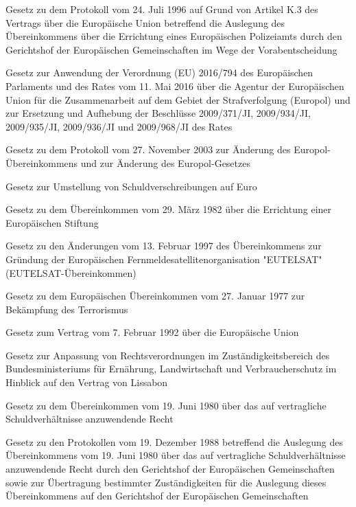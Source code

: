 \item[{EuropolAuslProtG}] Gesetz zu dem Protokoll vom 24. Juli 1996 auf Grund von Artikel K.3 des Vertrags über die Europäische Union betreffend die Auslegung des Übereinkommens über die Errichtung eines Europäischen Polizeiamts durch den Gerichtshof der Europäischen Gemeinschaften im Wege der Vorabentscheidung

\item[{EuropolG}] Gesetz zur Anwendung der Verordnung (EU) 2016/794 des Europäischen Parlaments und des Rates vom 11. Mai 2016 über die Agentur der Europäischen Union für die Zusammenarbeit auf dem Gebiet der Strafverfolgung (Europol) und zur Ersetzung und Aufhebung der Beschlüsse 2009/371/JI, 2009/934/JI, 2009/935/JI, 2009/936/JI und 2009/968/JI des Rates

\item[{EuropolÜbk-GÄndProtG}] Gesetz zu dem Protokoll vom 27. November 2003 zur Änderung des Europol-Übereinkommens und zur Änderung des Europol-Gesetzes

\item[{EuroUmstG}] Gesetz zur Umstellung von Schuldverschreibungen auf Euro

\item[{EuStiftÜbkG}] Gesetz zu dem Übereinkommen vom 29. März 1982 über die Errichtung einer Europäischen Stiftung

\item[{EUTELSATÜbkÄndG}] Gesetz zu den Änderungen vom 13. Februar 1997 des Übereinkommens zur Gründung der Europäischen Fernmeldesatellitenorganisation "EUTELSAT" (EUTELSAT-Übereinkommen)

\item[{EuTerrorÜbkG}] Gesetz zu dem Europäischen Übereinkommen vom 27. Januar 1977 zur Bekämpfung des Terrorismus

\item[{EUVtrG}] Gesetz zum Vertrag vom 7. Februar 1992 über die Europäische Union

\item[{EUVtrLissBMELVAnpG}] Gesetz zur Anpassung von Rechtsverordnungen im Zuständigkeitsbereich des Bundesministeriums für Ernährung, Landwirtschaft und Verbraucherschutz im Hinblick auf den Vertrag von Lissabon

\item[{EuVtrÜbkG}] Gesetz zu dem Übereinkommen vom 19. Juni 1980 über das auf vertragliche Schuldverhältnisse anzuwendende Recht

\item[{EuVtrÜbkProtG}] Gesetz zu den Protokollen vom 19. Dezember 1988 betreffend die Auslegung des Übereinkommens vom 19. Juni 1980 über das auf vertragliche Schuldverhältnisse anzuwendende Recht durch den Gerichtshof der Europäischen Gemeinschaften sowie zur Übertragung bestimmter Zuständigkeiten für die Auslegung dieses Übereinkommens auf den Gerichtshof der Europäischen Gemeinschaften

